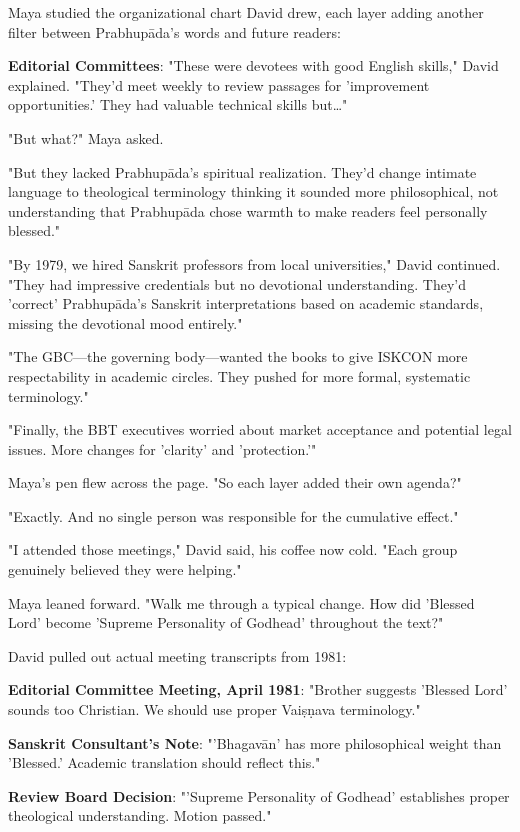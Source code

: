 \documentclass[12pt,twoside]{book}
\begin{document}
Maya studied the organizational chart David drew, each layer adding another filter between Prabhupāda's words and future readers:

\textbf{\textbf{Editorial Committees}}: "These were devotees with good English skills," David explained. "They'd meet weekly to review passages for 'improvement opportunities.' They had valuable technical skills but\ldots{}"

"But what?" Maya asked.

"But they lacked Prabhupāda's spiritual realization. They'd change intimate language to theological terminology thinking it sounded more philosophical, not understanding that Prabhupāda chose warmth to make readers feel personally blessed."

"By 1979, we hired Sanskrit professors from local universities," David continued. "They had impressive credentials but no devotional understanding. They'd 'correct' Prabhupāda's Sanskrit interpretations based on academic standards, missing the devotional mood entirely."

"The GBC—the governing body—wanted the books to give ISKCON more respectability in academic circles. They pushed for more formal, systematic terminology."

"Finally, the BBT executives worried about market acceptance and potential legal issues. More changes for 'clarity' and 'protection.'"

Maya's pen flew across the page. "So each layer added their own agenda?"

"Exactly. And no single person was responsible for the cumulative effect."


"I attended those meetings," David said, his coffee now cold. "Each group genuinely believed they were helping."

Maya leaned forward. "Walk me through a typical change. How did 'Blessed Lord' become 'Supreme Personality of Godhead' throughout the text?"

David pulled out actual meeting transcripts from 1981:

\textbf{\textbf{Editorial Committee Meeting, April 1981}}: "Brother suggests 'Blessed Lord' sounds too Christian. We should use proper Vaiṣṇava terminology."

\textbf{\textbf{Sanskrit Consultant's Note}}: "'Bhagavān' has more philosophical weight than 'Blessed.' Academic translation should reflect this."

\textbf{\textbf{Review Board Decision}}: "'Supreme Personality of Godhead' establishes proper theological understanding. Motion passed."
\end{document}
